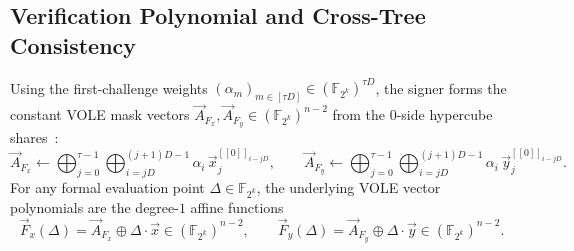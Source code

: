 \documentclass[11pt,a4paper]{article}
\theoremstyle{definition}
\theoremstyle{remark}
\newcommand{\Ftwok}{\mathbb{F}_{2^k}}
\newcommand{\share}[1]{[\![#1]\!]}
\begin{document}
\subsection{Verification Polynomial and Cross-Tree Consistency}
Using the first-challenge weights $(\alpha_m)_{m \in [\tau D]} \in (\Ftwok)^{\tau D}$, the signer forms the constant VOLE mask vectors $\vec{A}_{F_x}, \vec{A}_{F_y} \in (\Ftwok)^{n-2}$ from the $0$-side hypercube shares~\cite{HJ25}:
\begin{equation}
\label{eq:AFx-AFy}
\vec{A}_{F_x} \leftarrow \bigoplus_{j=0}^{\tau-1} \bigoplus_{i=jD}^{(j+1)D-1} \alpha_i \, \vec{x}_j^{\share{0}_{i - jD}}, \qquad
\vec{A}_{F_y} \leftarrow \bigoplus_{j=0}^{\tau-1} \bigoplus_{i=jD}^{(j+1)D-1} \alpha_i \, \vec{y}_j^{\share{0}_{i - jD}}.
\end{equation}
For any formal evaluation point $\Delta \in \Ftwok$, the underlying VOLE vector polynomials are the degree-$1$ affine functions
\begin{equation}
\label{eq:Fx-Fy-poly}
\vec{F}_x(\Delta) = \vec{A}_{F_x} \oplus \Delta \cdot \vec{x} \in (\Ftwok)^{n-2}, \qquad
\vec{F}_y(\Delta) = \vec{A}_{F_y} \oplus \Delta \cdot \vec{y} \in (\Ftwok)^{n-2}.
\end{equation}
\end{document}
